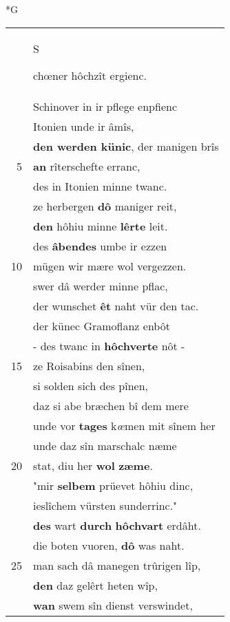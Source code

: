 \documentclass[8pt,a4paper,notitlepage]{article}
\begin{document}
\begin{table}[ht]
\begin{minipage}[t]{0.5\linewidth}
\small
\begin{center}*G
\end{center}
\begin{tabular}{rl}
 & \begin{large}S\end{large}chœner hôchzît ergienc.\\ 
 & Schinover in ir pflege enpfienc\\ 
 & Itonien unde ir âmîs,\\ 
 & \textbf{den werden künic}, der manigen brîs\\ 
5 & \textbf{an} rîterschefte erranc,\\ 
 & des in Itonien minne twanc.\\ 
 & ze herbergen \textbf{dô} maniger reit,\\ 
 & \textbf{den} hôhiu minne \textbf{lêrte} leit.\\ 
 & des \textbf{âbendes} umbe ir ezzen\\ 
10 & mügen wir mære wol vergezzen.\\ 
 & swer dâ werder minne pflac,\\ 
 & der wunschet \textbf{êt} naht vür den tac.\\ 
 & der künec Gramoflanz enbôt\\ 
 & - des twanc in \textbf{hôchverte} nôt -\\ 
15 & ze Roisabins den sînen,\\ 
 & si solden sich des pînen,\\ 
 & daz si abe bræchen bî dem mere\\ 
 & unde vor \textbf{tages} k\textit{œ}men mit sînem her\\ 
 & unde daz sîn marschalc næme\\ 
20 & stat, diu her \textbf{wol} \textbf{zæme}.\\ 
 & "mir \textbf{selbem} prüevet hôhiu dinc,\\ 
 & ieslîchem vürsten sunderrinc."\\ 
 & \textbf{des} wart \textbf{durch} \textbf{hôchvart} erdâht.\\ 
 & die boten vuoren, \textbf{dô} was naht.\\ 
25 & man sach dâ manegen trûrigen lîp,\\ 
 & \textbf{den} daz gelêrt heten wîp,\\ 
 & \textbf{wan} swem sîn dienst verswindet,\\ 

\end{tabular}
\end{minipage}
\end{table}
\end{document}

